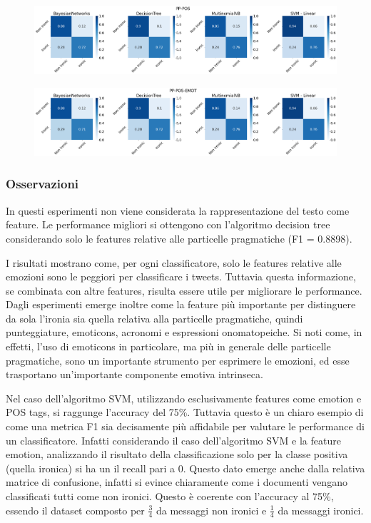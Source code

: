 \documentclass[oneside]{book}
\begin{document}
\begin{figure}[H]
	\centering
	\includegraphics[width=13cm]{assets/reports/conf-matrix/nobow/pp-pos.png}
\end{figure}
\vspace*{-0.8cm}

\begin{figure}[H]
	\centering
	\includegraphics[width=13cm]{assets/reports/conf-matrix/nobow/pp-pos-emot.png}
\end{figure}
\vspace*{-0.8cm}
\restoregeometry
\newpage

\subsubsection{Osservazioni}
In questi esperimenti non viene considerata la rappresentazione del testo come feature. Le performance migliori si ottengono con l'algoritmo decision tree considerando solo le features relative alle particelle pragmatiche (F1 = 0.8898).

I risultati mostrano come, per ogni classificatore, solo le features relative alle emozioni sono le peggiori per classificare i tweets. Tuttavia questa informazione, se combinata con altre features, risulta essere utile per migliorare le performance. Dagli esperimenti emerge inoltre come la feature più importante per distinguere da sola l'ironia sia quella relativa alla particelle pragmatiche, quindi punteggiature, emoticons, acronomi e espressioni onomatopeiche. Si noti come, in effetti, l'uso di emoticons in particolare, ma più in generale delle particelle pragmatiche, sono un importante strumento per esprimere le emozioni, ed esse trasportano un'importante componente emotiva intrinseca.

Nel caso dell'algoritmo SVM, utilizzando esclusivamente features come emotion e POS tags, si raggunge l'accuracy del 75\%. Tuttavia questo è un chiaro esempio di come una metrica F1 sia decisamente più affidabile per valutare le performance di un classificatore. Infatti considerando il caso dell'algoritmo SVM e la feature emotion, analizzando il risultato della classificazione solo per la classe positiva (quella ironica) si ha un il recall pari a 0. Questo dato emerge anche dalla relativa matrice di confusione, infatti si evince chiaramente come i documenti vengano classificati tutti come non ironici. Questo è coerente con l'accuracy al 75\%, essendo il dataset composto per $\frac{3}{4}$ da messaggi non ironici e $\frac{1}{4}$ da messaggi ironici.
\end{document}
